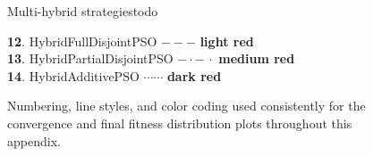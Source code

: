 \begin{figure}[H]
\begin{colorblock}{Multi-hybrid strategies}{todo}
\begin{scriptsize}
\textbf{12}. HybridFullDisjointPSO \quad $- - -$ \colorbox{todolight}{\textbf{light red}} \\
\textbf{13}. HybridPartialDisjointPSO \quad $\mathbf{- \cdot -\, \cdot }$ \colorbox{todomedium}{\textbf{medium red}}\\
\textbf{14}. HybridAdditivePSO \quad $\mathbf{\cdots\cdots }$ \colorbox{tododark}{\textbf{dark red}}\end{scriptsize}
\end{colorblock}
\caption[Plot legend]{Numbering, line styles, and color coding used consistently for the convergence and final fitness distribution plots throughout this appendix.}
    \label{fig:plot_encoding}
\end{figure}
\vspace{.875em}









